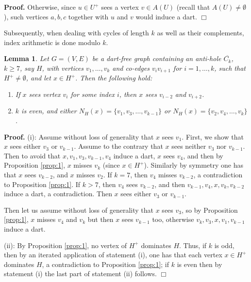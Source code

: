 \documentclass[11pt]{article}
\newcommand{\qed}{\hfill $\Box$}
\newcommand{\0}{\text{ has a co-join to }}
\newcommand{\1}{\text{ has a join to }}
\newtheorem{lemm}{Lemma}
\begin{document}
\noindent
{\bf Proof.} Otherwise, since $u \in U^+$ sees a vertex $v \in A(U)$ (recall that $A(U) \neq \emptyset$), such vertices $a,b,c$ together with $u$ and $v$ would induce a dart. \qed

\medskip

Subsequently, when dealing with cycles of length $k$ as well as their complements, index arithmetic is done modulo $k$.

\begin{lemm}\label{lemm:1}
Let $G = (V,E)$ be a dart-free graph containing an anti-hole $\overline{C_k}$, $k \geq 7$, say $H$, with vertices $v_1,\ldots,v_k$ and co-edges $v_iv_{i+1}$ for $i = 1,\ldots,k$, such that $H^+ \neq \emptyset$, and let $x \in H^+$. Then the following hold:
\begin{enumerate}
\item[$(i)$] If $x$ sees vertex $v_i$ for some index $i$, then $x$ sees $v_{i-2}$ and $v_{i+2}$.
\item[$(ii)$] $k$ is even, and either $N_H(x) = \{v_1,v_3,\ldots,v_{k-1}\}$ or 
$N_H(x) = \{v_2,v_4,\ldots,v_k\}$.
\end{enumerate}
\end{lemm}

\noindent
{\bf Proof.} (i): Assume without loss of generality that $x$ sees $v_1$. First, we show that $x$ sees either $v_3$ or $v_{k-1}$.
Assume to the contrary that $x$ sees neither $v_3$ nor $v_{k-1}$. Then to avoid that $x,v_1,v_3,v_{k-1},v_4$ induce a dart, $x$ sees $v_4$, and then by Proposition \ref{prop:1}, $x$ misses $v_k$ (since $x \in H^+$). Similarly by symmetry one has that $x$ sees $v_{k-2}$, and $x$ misses $v_2$. If $k = 7$, then $v_4$ misses $v_{k-2}$, a contradiction to Proposition \ref{prop:1}. If $k > 7$, then $v_4$ sees $v_{k-2}$, and then $v_{k-1},v_4,x,v_k,v_{k-2}$ induce a dart, a contradiction. Then $x$ sees either $v_3$ or $v_{k-1}$.

Then let us assume without loss of generality that $x$ sees $v_3$, so by Proposition \ref{prop:1}, $x$ misses $v_4$ and $v_k$ but then $x$ sees $v_{k-1}$ too, otherwise $v_k,v_3,x,v_1,v_{k-1}$ induce a dart.

\medskip

\noindent
(ii): By Proposition \ref{prop:1}, no vertex of $H^+$ dominates $H$. Thus, if $k$ is odd, then by an iterated application of statement (i), one has that each vertex $x \in H^+$ dominates $H$, a contradiction to Proposition \ref{prop:1}; if $k$ is even then by statement (i) the last part of statement (ii) follows.      
\qed
\end{document}
